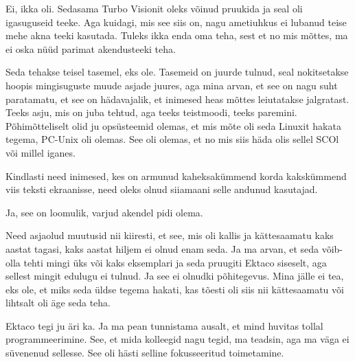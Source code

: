 
Ei, ikka oli. Sedasama Turbo Visionit oleks võinud pruukida ja seal oli 
igasuguseid teeke. Aga kuidagi, mis see siis on, nagu ametiuhkus ei lubanud 
teise mehe akna teeki kasutada. Tuleks ikka enda oma teha, sest et no mis 
mõttes, ma ei oska nüüd parimat akendusteeki teha. 


Seda tehakse teisel tasemel, eks ole. Tasemeid on juurde tulnud, seal 
nokitsetakse hoopis mingisuguste muude asjade juures, aga mina arvan, et see on 
nagu suht paratamatu, et see on hädavajalik, et inimesed heas mõttes 
leiutatakse jalgratast. Teeks asju, mis on juba tehtud, aga teeks teistmoodi, 
teeks paremini. Põhimõtteliselt olid ju opsüsteemid olemas, et mis mõte oli 
seda Linuxit hakata tegema, PC-Unix oli olemas. See oli olemas, et no mis siis 
häda olis sellel SCOl või millel iganes. 



Kindlasti need inimesed, kes on armunud kaheksakümmend korda kakskümmend viis 
teksti ekraanisse, need oleks olnud siiamaani selle andunud kasutajad. 


Ja, see on loomulik, varjud akendel pidi olema.


Need asjaolud muutusid nii kiiresti, et see, mis oli kallis ja kättesaamatu 
kaks aastat tagasi,  kaks aastat hiljem ei olnud enam seda. Ja ma arvan, et 
seda võib-olla tehti mingi üks või kaks eksemplari ja seda pruugiti Ektaco 
siseselt, aga sellest mingit edulugu ei tulnud. Ja see ei olnudki põhitegevus. 
Mina jälle ei tea, eks ole, et miks seda üldse tegema hakati, kas tõesti oli 
siis nii kättesaamatu või lihtsalt oli äge seda teha.  


Ektaco tegi ju  äri ka. Ja ma pean tunnistama ausalt, et  mind huvitas tollal 
programmeerimine. See, et mida  kolleegid nagu tegid, ma teadsin, aga ma väga 
ei süvenenud sellesse. See oli hästi selline fokusseeritud toimetamine.

